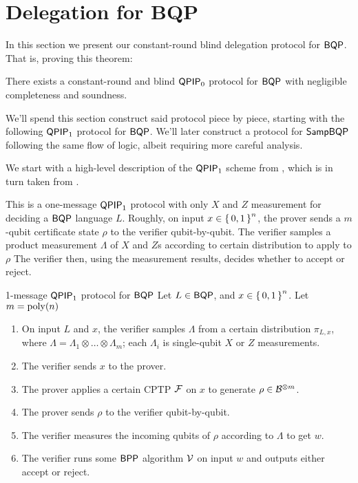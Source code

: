 \section{Delegation for BQP}
\label{sec:BlindBQP}



In this section we present our constant-round blind delegation protocol for $\operatorname{\mathsf{BQP}}$. That is, proving this theorem:
\begin{thm}
	\label{thm:QPIP0BQP}
	There exists a constant-round and blind $\operatorname{\mathsf{QPIP}}_0$ protocol for $\operatorname{\mathsf{BQP}}$ with negligible completeness and soundness.
\end{thm}
We'll spend this section construct said protocol piece by piece, starting with the following $\operatorname{\mathsf{QPIP}}_1$ protocol for $\operatorname{\mathsf{BQP}}$.
We'll later construct a protocol for $\operatorname{\mathsf{SampBQP}}$ following the same flow of logic, albeit requiring more careful analysis.

We start with a high-level description of the $\operatorname{\mathsf{QPIP}}_1$ scheme from \cite{mahadev_delegation}, which is in turn taken from \cite{mf16}.

This is a one-message $\operatorname{\mathsf{QPIP}}_1$ protocol with only $X$ and $Z$ measurement for deciding a $\operatorname{\mathsf{BQP}}$ language $L$.
Roughly, on input $x\in\set{0,1}^n$, the prover sends a $m$-qubit certificate state $\rho$ to the verifier qubit-by-qubit.
The verifier samples a product measurement $\Lambda$ of $X$ and $Z$s according to certain distribution to apply to $\rho$
The verifier then, using the measurement results, decides whether to accept or reject.

\begin{protocol}{1-message $\operatorname{\mathsf{QPIP}}_1$ protocol for $\operatorname{\mathsf{BQP}}$}
	\label{proto:BQP}
	Let $L\in\operatorname{\mathsf{BQP}}$, and $x\in\set{0,1}^n$. Let $m=\operatorname*{\operatorname{poly}}(n)$
	\begin{enumerate}
		\item On input $L$ and $x$, the verifier samples $\Lambda$ from a certain distribution $\pi_{L, x}$, where $\Lambda=\Lambda_1\otimes\ldots\otimes\Lambda_m$; each $\Lambda_i$ is single-qubit $X$ or $Z$ measurements.
		\item The verifier sends $x$ to the prover.
		\item The prover applies a certain CPTP $\mathcal{F}$ on $x$ to generate $\rho\in\mathcal{B}^{\otimes m}$.
		\item The prover sends $\rho$ to the verifier qubit-by-qubit.
		\item The verifier measures the incoming qubits of $\rho$ according to $\Lambda$ to get $w$.
		\item The verifier runs some $\operatorname{\mathsf{BPP}}$ algorithm $\mathcal{V}$ on input $w$ and outputs either accept or reject.
	\end{enumerate}
\end{protocol}

